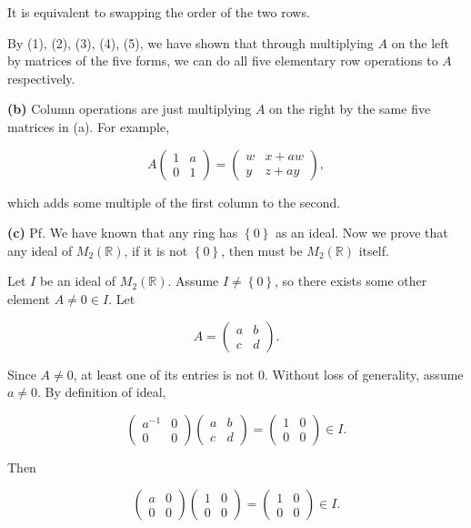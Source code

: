 It is equivalent to swapping the order of the two rows.

By (1), (2), (3), (4), (5), we have shown that through multiplying \(A\) on the left by matrices of the five forms, we can do all five elementary row operations to \(A\) respectively.

\textbf{(b)} Column operations are just multiplying \(A\) on the right by the same five matrices in (a). For example,

\[A\begin{pmatrix}
1 & a \\
0 & 1
\end{pmatrix} = \begin{pmatrix}
w & {x + aw} \\
y & {z + ay}
\end{pmatrix},\]

which adds some multiple of the first column to the second.

\textbf{(c)} Pf. We have known that any ring has \(\left\{ 0 \right\}\) as an ideal. Now we prove that any ideal of \(M_{2}\left( \mathbb{R} \right)\), if it is not \(\left\{ 0 \right\}\), then must be \(M_{2}\left( \mathbb{R} \right)\) itself.

Let \(I\) be an ideal of \(M_{2}\left( \mathbb{R} \right)\). Assume \(I \neq \left\{ 0 \right\}\), so there exists some other element \(A \neq 0 \in I\). Let

\[A = \begin{pmatrix}
a & b \\
c & d
\end{pmatrix}.\]

Since \(A \neq 0\), at least one of its entries is not \(0\). Without loss of generality, assume \(a \neq 0\). By definition of ideal,

\[\begin{pmatrix}
a^{- 1} & 0 \\
0 & 0
\end{pmatrix}\begin{pmatrix}
a & b \\
c & d
\end{pmatrix} = \begin{pmatrix}
1 & 0 \\
0 & 0
\end{pmatrix} \in I.\]

Then

\[\begin{pmatrix}
a & 0 \\
0 & 0
\end{pmatrix}\begin{pmatrix}
1 & 0 \\
0 & 0
\end{pmatrix} = \begin{pmatrix}
1 & 0 \\
0 & 0
\end{pmatrix} \in I.\]

